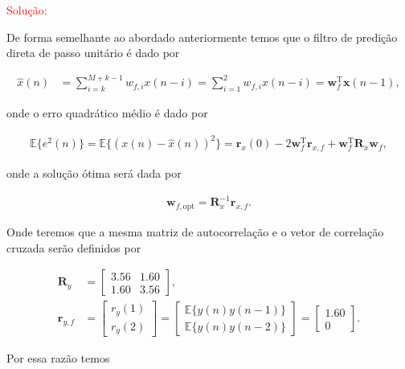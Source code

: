 \documentclass[a4paper,10pt]{article}
\begin{document}
\begin{enumerate}
\begin{enumerate}
						\textcolor{red}{Solução:}

						De forma semelhante ao abordado anteriormente temos que o filtro de predição direta de passo unitário é dado por
						
						\begin{align}
							\hat{x}(n) &= \sum^{M + k - 1}_{i = k} w_{f,i} x(n - i) = \sum^{2}_{i = 1} w_{f,i} x(n - i) = \mathbf{w}^{\text{T}}_{f} \mathbf{x}(n - 1),
						\end{align}

						onde o erro quadrático médio é dado por

						\begin{align}
							\mathbb{E}\{e^{2}(n)\} = \mathbb{E}\{(x(n) - \hat{x}(n) )^{2}\} = \mathbf{r}_{x}(0) - 2 \mathbf{w}^{\text{T}}_{f} \mathbf{r}_{x,f} + \mathbf{w}^{\text{T}}_{f} \mathbf{R}_{x} \mathbf{w}_{f},
						\end{align}

						onde a solução ótima será dada por

						\begin{align}
							\mathbf{w}_{f,\text{opt}} = \mathbf{R}^{-1}_{x} \mathbf{r}_{x,f}.
						\end{align}

						Onde teremos que a mesma matriz de autocorrelação e o vetor de correlação cruzada serão definidos por

						\begin{align}
							\mathbf{R}_{y} &=
							\begin{bmatrix}
								3.56 & 1.60 \\
								1.60 & 3.56
							\end{bmatrix}, \\
							\mathbf{r}_{y,f} &= 
							\begin{bmatrix}
								r_{y}(1) \\
								r_{y}(2)
							\end{bmatrix} =
							\begin{bmatrix}
								\mathbb{E}\{y(n) y(n - 1)\} \\
								\mathbb{E}\{y(n) y(n - 2)\}
							\end{bmatrix} = 
							\begin{bmatrix}
								1.60 \\
								0
							\end{bmatrix}.
						\end{align}

						Por essa razão temos


\end{enumerate}
\end{enumerate}
\end{document}
